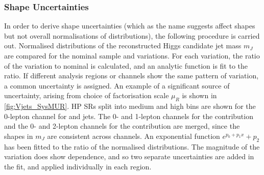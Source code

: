 

\subsubsection{Shape Uncertainties}

In order to derive shape uncertainties (which as the name suggests affect shapes but not overall normalisations of distributions), the following procedure is carried out.
Normalised distributions of the reconstructed \largeR Higgs candidate jet mass $m_J$ are compared for the nominal sample and variations.
For each variation, the ratio of the variation to nominal is calculated, and an analytic function is fit to the ratio.
If different analysis regions or channels show the same pattern of variation, a common uncertainty is assigned.
An example of a significant source of uncertainty, arising from choice of factorisation scale $\mu_R$ is shown in \cref{fig:Vjets_SysMUR}.
HP SRs split into medium and high \pTV bins are shown for the 0-lepton channel for \Whf and \Zhf jets.
The 0- and 1-lepton channels for the \Whf contribution and the 0- and 2-lepton channels for the \Zjets contribution are merged, since the shapes in $m_J$ are consistent across channels.
An exponential function $e^{p_0+p_1x}+p_2$ has been fitted to the ratio of the normalised distributions.
The magnitude of the variation does show \ptv dependence, and so two separate uncertainties are added in the fit, and applied individually in each \pTV region. 
%
